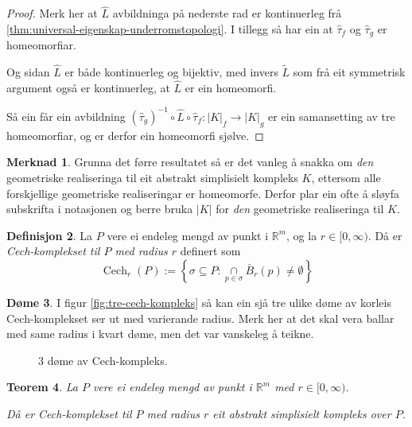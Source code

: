 \documentclass[a4paper, 12pt, norsk]{article}
\theoremstyle{plain}
\newtheorem{theorem}{Teorem}[section]
\theoremstyle{definition}
\newtheorem{definition}[theorem]{Definisjon}
\newtheorem{example}[theorem]{Døme}
\newtheorem{remark}[theorem]{Merknad}
\newcommand{\Rb}{\mathbb{R}}
\newcommand{\intersect}{ \mathop{\cap}\limits }
\newcommand{\gr}[1]{ \lvert #1 \rvert } %
\DeclareMathOperator{\Cech}{Cech} %
\begin{document}
\begin{proof}
	Merk her at \( \hat{L} \) avbildninga på nederste rad er kontinuerleg frå \autoref{thm:universal-eigenskap-underromstopologi}. I tillegg så har ein at \( \hat{\tau}_f \) og \( \hat{\tau}_g \) er homeomorfiar.

	Og sidan $\hat{L}$ er både kontinuerleg og bijektiv, med invers $\tilde{L}$ som frå eit symmetrisk argument også er kontinuerleg, at $\hat{L}$ er ein homeomorfi.

	Så ein får ein avbildning $(\hat{\tau}_g)^{-1}\circ\hat{L}\circ\hat{\tau}_f:\gr{K}_f\to\gr{K}_g$ er ein samansetting av tre homeomorfiar, og er derfor ein homeomorfi sjølve.
\end{proof}

\begin{remark}
	Grunna det førre resultatet så er det vanleg å snakka om \emph{den} geometriske realiseringa til eit abstrakt simplisielt kompleks $K$, ettersom alle forskjellige geometriske realiseringar er homeomorfe. Derfor plar ein ofte å sløyfa subskrifta i notasjonen og berre bruka $\gr{K}$ for \emph{den} geometriske realiseringa til $K$.
\end{remark}

\begin{definition}
	La \( P \) vere ei endeleg mengd av punkt i \( \Rb^m \), og la \( r \in [0, \infty) \).
	Då er \emph{Cech-komplekset til $P$ med radius $r$} definert som
	\[
		\Cech_r(P) := \left\{\sigma\subseteq P : \intersect_{p\in\sigma}\bar{B}_r(p)\neq\emptyset\right\}
	\]
\end{definition}

\begin{example}
	 I figur \autoref{fig:tre-cech-kompleks} så kan ein sjå tre ulike døme av korleis Cech-komplekset ser ut med varierande radius. Merk her at det skal vera ballar med same radius i kvart døme, men det var vanskeleg å teikne.
	\begin{figure}[htbp]
		\begin{center}
			
		\end{center}
		\caption{3 døme av Cech-kompleks.}
		\label{fig:tre-cech-kompleks}
	\end{figure}
\end{example}

\begin{theorem} \label{thm:CASK}
	La \( P \) vere ei endeleg mengd av punkt i \( \Rb^m \) med \( r \in [0, \infty) \).
	
	Då er Cech-komplekset til $P$ med radius $r$ eit abstrakt simplisielt kompleks over $P$.
\end{theorem}
\end{document}
